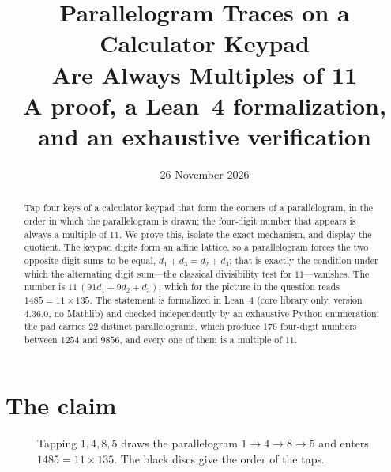 \documentclass[11pt,a4paper]{article}
\title{\bfseries Parallelogram Traces on a Calculator Keypad\\[3pt]
Are Always Multiples of 11\\[8pt]
\large A proof, a Lean~4 formalization, and an exhaustive verification}
\author{}
\date{26 November 2026}
\theoremstyle{definition}
\theoremstyle{remark}
\begin{document}
\maketitle

\begin{abstract}
\noindent
Tap four keys of a calculator keypad that form the corners of a parallelogram, in
the order in which the parallelogram is drawn; the four-digit number that appears
is always a multiple of $11$. We prove this, isolate the exact mechanism, and
display the quotient. The keypad digits form an affine lattice, so a parallelogram
forces the two opposite digit sums to be equal, $d_1+d_3=d_2+d_4$; that is exactly
the condition under which the alternating digit sum---the classical divisibility
test for $11$---vanishes. The number is $11\,(91d_1+9d_2+d_3)$, which for the
picture in the question reads $1485=11\times 135$. The statement is formalized in
Lean~4 (core library only, version 4.36.0, no Mathlib) and checked independently by
an exhaustive Python enumeration: the pad carries $22$ distinct parallelograms,
which produce $176$ four-digit numbers between $1254$ and $9856$, and every one of
them is a multiple of $11$.
\end{abstract}

\section{The claim}

\begin{figure}[htbp]
\centering
{}
\caption{Tapping $1,4,8,5$ draws the parallelogram $1\to4\to8\to5$ and enters
$1485=11\times 135$. The black discs give the order of the taps.}
\label{fig:keypad}
\end{figure}
\end{document}
